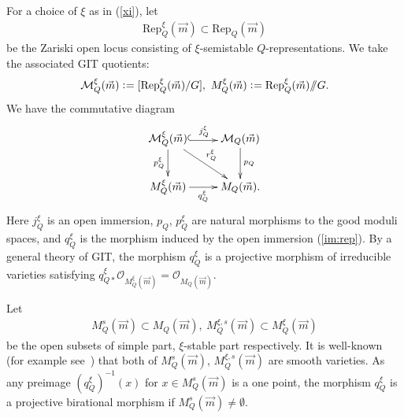 \documentclass[11pt]{amsart}
\theoremstyle{plain}
\theoremstyle{definition}
\theoremstyle{remark}
\newcommand{\sslash}{/\!\!/}
\newcommand{\mM}{\mathcal{M}}
\newcommand{\oO}{\mathcal{O}}
\begin{document}
For a choice of $\xi$ as in (\ref{xi}), let 
\begin{align}\label{im:rep}
\mathrm{Rep}_Q^{\xi}(\vec{m}) \subset \mathrm{Rep}_Q(\vec{m})
\end{align}
be the Zariski 
open locus consisting of $\xi$-semistable 
$Q$-representations. 
We 
take the associated GIT quotients: 
\begin{align*}
\mM_{Q}^{\xi}(\vec{m}) \cneq [\mathrm{Rep}_Q^{\xi}(\vec{m})/G], \ 
M_{Q}^{\xi}(\vec{m}) \cneq \mathrm{Rep}_Q^{\xi}(\vec{m})\sslash G.
\end{align*}
We have the commutative diagram
\begin{align}\label{com:MQ}
\xymatrix{
\mM_{Q}^{\xi}(\vec{m}) \ar@<-0.3ex>@{^{(}->}[r]^{j_Q^{\xi}} \ar[d]_-{p_Q^{\xi}}
\ar[rd]^-{r_Q^{\xi}} & 
\mM_{Q}(\vec{m}) \ar[d]^-{p_Q} \\
M_Q^{\xi}(\vec{m}) \ar[r]_-{q^{\xi}_Q} & M_Q(\vec{m}).
}
\end{align}
Here $j_Q^{\xi}$ is an open immersion, 
$p_Q$, $p_Q^{\xi}$ are natural morphisms to the 
good moduli spaces, and $q_Q^{\xi}$ is the morphism 
induced by the open immersion (\ref{im:rep}). 
By a general theory of GIT, the morphism $q_Q^{\xi}$ is a projective 
morphism of irreducible varieties
satisfying $q_{Q \ast}^{\xi}\oO_{M_Q^{\xi}(\vec{m})}=\oO_{M_Q(\vec{m})}$. 

Let 
\begin{align*}
M_Q^{s}(\vec{m}) \subset M_Q(\vec{m}), \ 
M_{Q}^{\xi, s}(\vec{m}) \subset M_{Q}^{\xi}(\vec{m})
\end{align*}
be the open subsets of 
simple part, $\xi$-stable part 
respectively. 
It is well-known (for example see~\cite{MR2484736})
that 
both of $M_Q^{s}(\vec{m})$, $M_Q^{\xi, s}(\vec{m})$
are smooth varieties. 
As any preimage $(q_Q^{\xi})^{-1}(x)$
for $x \in M_Q^s(\vec{m})$ is a one point, 
the morphism $q_Q^{\xi}$ is a projective birational 
morphism if $M_Q^s(\vec{m}) \neq \emptyset$. 
\end{document}
